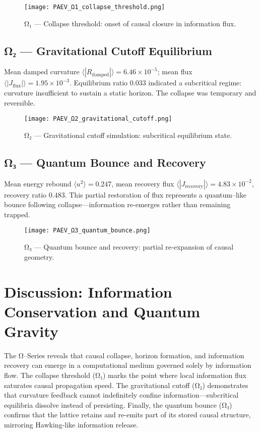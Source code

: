 \documentclass[11pt,a4paper]{article}
\begin{document}
\begin{figure}[h]
\centering
\texttt{[image: PAEV\_Ω1\_collapse\_threshold.png]}
\caption{Ω₁ — Collapse threshold: onset of causal closure in information flux.}
\end{figure}

\subsection*{Ω₂ — Gravitational Cutoff Equilibrium}
Mean damped curvature \(\langle |R_{\text{damped}}| \rangle = 6.46\times10^{-5}\); 
mean flux \(\langle |J_{\text{flux}}| \rangle = 1.95\times10^{-3}\).  
Equilibrium ratio \(0.033\) indicated a subcritical regime: curvature insufficient to sustain a static horizon.  
The collapse was temporary and reversible.

\begin{figure}[h]
\centering
\texttt{[image: PAEV\_Ω2\_gravitational\_cutoff.png]}
\caption{Ω₂ — Gravitational cutoff simulation: subcritical equilibrium state.}
\end{figure}

\subsection*{Ω₃ — Quantum Bounce and Recovery}
Mean energy rebound \(\langle u^2 \rangle = 0.247\), mean recovery flux \(\langle |J_{\text{recovery}}| \rangle = 4.83\times10^{-2}\), recovery ratio \(0.483\).  
This partial restoration of flux represents a quantum--like bounce following collapse—information re-emerges rather than remaining trapped.

\begin{figure}[h]
\centering
\texttt{[image: PAEV\_Ω3\_quantum\_bounce.png]}
\caption{Ω₃ — Quantum bounce and recovery: partial re-expansion of causal geometry.}
\end{figure}

\section{Discussion: Information Conservation and Quantum Gravity}
The Ω--Series reveals that causal collapse, horizon formation, and information recovery can emerge in a computational medium governed solely by information flow.  
The collapse threshold (Ω₁) marks the point where local information flux saturates causal propagation speed.  
The gravitational cutoff (Ω₂) demonstrates that curvature feedback cannot indefinitely confine information—subcritical equilibria dissolve instead of persisting.  
Finally, the quantum bounce (Ω₃) confirms that the lattice retains and re-emits part of its stored causal structure, mirroring Hawking-like information release.
\end{document}
